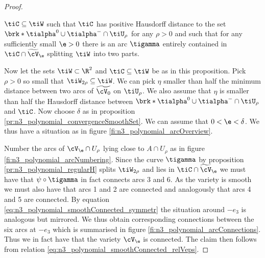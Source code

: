 \begin{proof}
\begin{proposition}
    $\tiC\subseteq \tiW$ such that $\tiC$ has positive Hausdorff distance to the set
    $\brk*{\tialpha^0\cup\tialpha^-}\cap \tiU_\rho$ for any $\rho>0$
    and such that for any sufficiently small $\e>0$ there is an arc $\tigamma$
    entirely contained in $\tiC\cap\widetilde{\cV}_\e$ splitting $\tiW$ into two parts.
  \end{proposition}
  Now let the sets $\tiW\subset\R^2$ and $\tiC\subseteq \tiW$ be as in this proposition.
  Pick $\rho>0$ so small that $\tiW_{2\rho}\subseteq \tiW$. 
  We can pick $\eta$ smaller than half the minimum distance between two arcs of $\widetilde{\cV_0}$ on $\tiU_{\rho}$.
  We also assume that $\eta$ is smaller than half the Hausdorff distance between $\brk*{\tialpha^0\cup\tialpha^-}\cap\tiU_\rho$
  and $\tiC$.
  Now choose $\delta$ as in proposition \ref{pr:n3_polynomial_convergenceSmoothSet}. We can assume that $0<\e<\delta$.
  We thus have a situation as in figure \ref{fi:n3_polynomial_arcOverview}.
  
  Number the arcs of $\cV_\e\cap U_\rho$ lying close to $A\cap U_\rho$ as in figure \ref{fi:n3_polynomial_arcNumbering}.
  Since the curve $\tigamma$ by proposition \ref{pr:n3_polynomial_regularH} splits $\tiW_{2\rho}$ and lies in $\tiC\cap\widetilde{\cV}_\e$ we must have that
  $\psi\circ\tigamma$ in fact connects arcs 3 and 6.
  As the variety is smooth we must also have that arcs 1 and 2 are connected
  and analogously that arcs 4 and 5 are connected.
  By equation \eqref{eq:n3_polynomial_smoothConnected_symmetr} the situation around $-e_3$ is analogous but mirrored.
  We thus obtain corresponding connections between the six arcs at $-e_3$ which is summarised in figure \ref{fi:n3_polynomial_arcConnections}.
  Thus we in fact have that the variety $\cV_\e$ is connected.
  The claim then follows from relation \eqref{eq:n3_polynomial_smoothConnected_relVeps}.
\end{proof}

